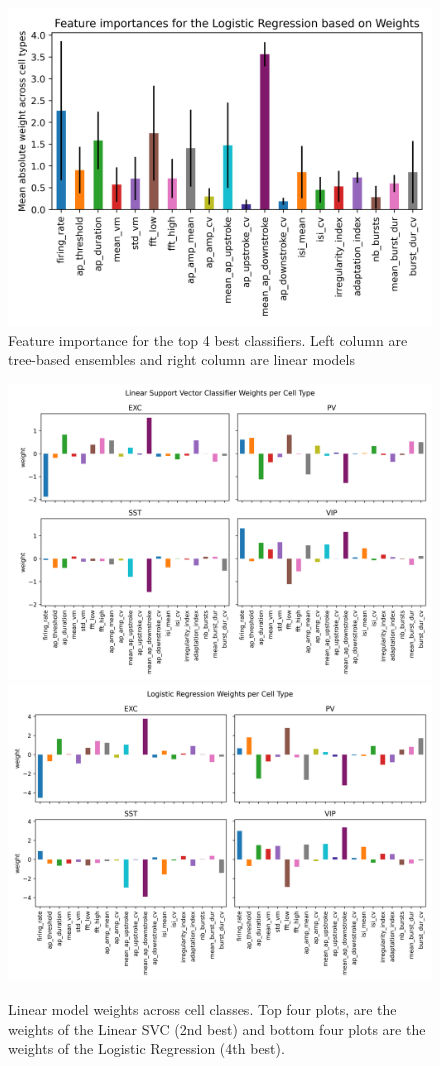 \documentclass{IEEEtran}
\begin{document}
\begin{figure}[h!]
  \includegraphics[width=0.9\columnwidth]{figures/feature_importance_lr.png}
  \caption{Feature importance for the top 4 best classifiers. Left column are tree-based ensembles and right column are linear models}%
  \label{fig:feature_importances}
\end{figure}


\begin{figure}[h!]%
  \centering
  \includegraphics[width=0.9\columnwidth]{figures/weights_linearsvc.png}
  \includegraphics[width=0.9\columnwidth]{figures/weights_logistic_regression.png}
  \caption{Linear model weights across cell classes. Top four plots, are the weights of the Linear SVC (2nd best) and bottom four plots are the weights of the Logistic Regression (4th best).}%
  \label{fig:weights}
\end{figure}
\end{document}
